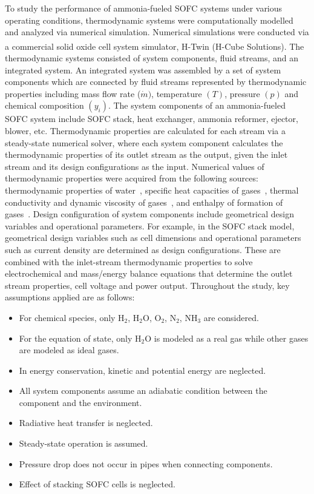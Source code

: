 \documentclass[a4paper,10pt]{cas-dc} %
\begin{document}
To study the performance of ammonia-fueled SOFC systems under various operating conditions, thermodynamic systems were computationally modelled and analyzed via numerical simulation.
Numerical simulations were conducted via a commercial solid oxide cell system simulator, H-Twin\textsuperscript{\textregistered} (H-Cube Solutions).
The thermodynamic systems consisted of system components, fluid streams, and an integrated system.
An integrated system was assembled by a set of system components which are connected by fluid streams represented by thermodynamic properties including mass flow rate (\(\dot{m})\), temperature \((T)\), pressure \((p)\) and chemical composition \((y_i)\).
The system components of an ammonia-fueled SOFC system include SOFC stack, heat exchanger, ammonia reformer, ejector, blower, etc.
Thermodynamic properties are calculated for each stream via a steady-state numerical solver, where each system component calculates the thermodynamic properties of its outlet stream as the output, given the inlet stream and its design configurations as the input.
Numerical values of thermodynamic properties were acquired from the following sources: thermodynamic properties of water~\cite{Wagner2008}, specific heat capacities of gases~\cite{Smith1999GRIMech30}, thermal conductivity and dynamic viscosity of gases~\cite{TODD2002186}, and enthalpy of formation of gases~\cite{moran2017moran}.
Design configuration of system components include geometrical design variables and operational parameters.
For example, in the SOFC stack model, geometrical design variables such as cell dimensions and operational parameters such as current density are determined as design configurations.
These are combined with the inlet-stream thermodynamic properties to solve electrochemical and mass/energy balance equations that determine the outlet stream properties, cell voltage and power output.
Throughout the study, key assumptions applied are as follows:

\begin{itemize}
\item For chemical species, only H$_2$, H$_2$O, O$_2$, N$_2$, NH$_3$ are considered.
\item For the equation of state, only H$_2$O is modeled as a real gas while other gases are modeled as ideal gases.
\item In energy conservation, kinetic and potential energy are neglected.
\item All system components assume an adiabatic condition between the component and the environment.
\item Radiative heat transfer is neglected.
\item Steady-state operation is assumed.
\item Pressure drop does not occur in pipes when connecting components.
\item Effect of stacking SOFC cells is neglected.
\end{itemize}
\end{document}
